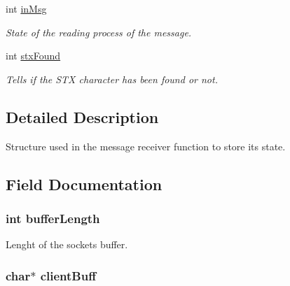 \begin{DoxyCompactItemize}
int \hyperlink{struct_m_p___r_e_c_e_i_v_e_r_s_t_r_a14a10ff130d21a1ac68bc933e35e635a}{in\+Msg}
\begin{DoxyCompactList}\small\item\em State of the reading process of the message. \end{DoxyCompactList}\item 
int \hyperlink{struct_m_p___r_e_c_e_i_v_e_r_s_t_r_ab1326ba5ad761ac81725f9c02523030f}{stx\+Found}
\begin{DoxyCompactList}\small\item\em Tells if the S\+TX character has been found or not. \end{DoxyCompactList}\end{DoxyCompactItemize}


\subsection{Detailed Description}
Structure used in the message receiver function to store it\textquotesingle{}s state. 

\subsection{Field Documentation}
\subsubsection[{\texorpdfstring{buffer\+Length}{bufferLength}}]{\setlength{\rightskip}{0pt plus 5cm}int buffer\+Length}\hypertarget{struct_m_p___r_e_c_e_i_v_e_r_s_t_r_a178a88ce8bf1f116a5d9ce779f71ca86}{}\label{struct_m_p___r_e_c_e_i_v_e_r_s_t_r_a178a88ce8bf1f116a5d9ce779f71ca86}


Lenght of the socket\textquotesingle{}s buffer. 

\subsubsection[{\texorpdfstring{client\+Buff}{clientBuff}}]{\setlength{\rightskip}{0pt plus 5cm}char$\ast$ client\+Buff}\hypertarget{struct_m_p___r_e_c_e_i_v_e_r_s_t_r_ad7596f9bf59cc07314a716781969cf96}{}\label{struct_m_p___r_e_c_e_i_v_e_r_s_t_r_ad7596f9bf59cc07314a716781969cf96}


